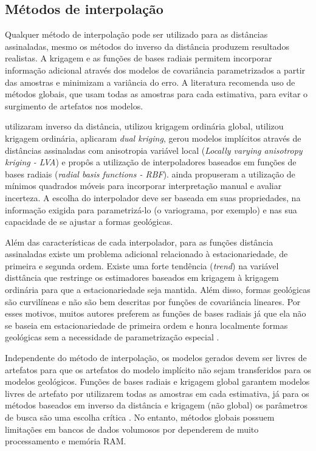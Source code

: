 \subsection{Métodos de interpolação}\label{met_int}

Qualquer método de interpolação pode ser utilizado para as distâncias assinaladas, mesmo os métodos do inverso da distância produzem resultados realistas. A krigagem e as funções de bases radiais permitem incorporar informação adicional através dos modelos de covariância parametrizados a partir das amostras e minimizam a variância do erro. A literatura recomenda uso de métodos globais, que usam todas as amostras para cada estimativa, para evitar o surgimento de artefatos nos modelos.

 utilizaram inverso da distância,  utilizou krigagem ordinária global,  utilizou krigagem ordinária,  aplicaram \textit{dual kriging},  gerou modelos implícitos através de distâncias assinaladas com anisotropia variável local (\textit{Locally varying anisotropy kriging - LVA}) e  propôs a utilização de interpoladores baseados em funções de bases radiais (\textit{radial basis functions - RBF}).  ainda propuseram a utilização de mínimos quadrados móveis para incorporar interpretação manual e avaliar incerteza. A escolha do interpolador deve ser baseada em suas propriedades, na informação exigida para parametrizá-lo (o variograma, por exemplo) e nas sua capacidade de se ajustar a formas geológicas.

Além das características de cada interpolador, para as funções distância assinaladas existe um problema adicional relacionado à estacionariedade, de primeira e segunda ordem. Existe uma forte tendência (\textit{trend}) na variável disttância que restringe os estimadores baseados em krigagem à krigagem ordinária para que a estacionariedade seja mantida. Além disso, formas geológicas são curvilíneas e não são bem descritas por funções de covariância lineares. Por esses motivos, muitos autores preferem as funções de bases radiais já que ela não se baseia em estacionariedade de primeira ordem e honra localmente formas geológicas sem a necessidade de parametrização especial \cite{martin2017implicitmodeling}.

Independente do método de interpolação, os modelos gerados devem ser livres de artefatos para que os artefatos do modelo implícito não sejam transferidos para os modelos geológicos. Funções de bases radiais e krigagem global garantem modelos livres de artefato por utilizarem todas as amostras em cada estimativa, já para os métodos baseados em inverso da distância e krigagem (não global) os parâmetros de busca são uma escolha crítica \cite{martin2017implicitmodeling}. No entanto, métodos globais possuem limitações em bancos de dados volumosos por dependerem de muito processamento e memória RAM.


